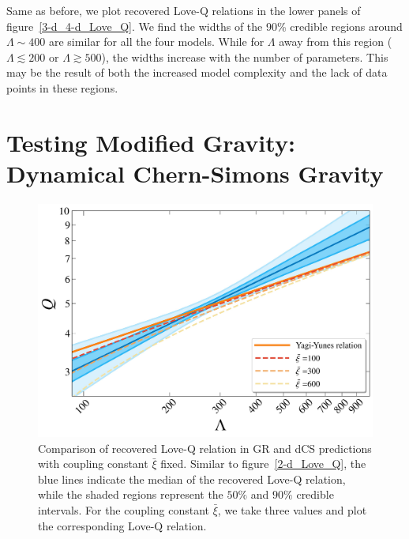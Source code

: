 \documentclass[a4paper,11pt]{article}
\begin{document}
Same as before, we plot recovered Love-Q relations in the lower panels of 
figure~\ref{3-d_4-d_Love_Q}. We find the widths of the 90\% credible regions 
around $\Lambda \sim 400$ are similar for all the four models. While for
$\Lambda$ away from this region ($\Lambda \lesssim 200$ or $\Lambda \gtrsim 500$), 
the widths increase with the number of parameters. This may be the result of both 
the increased model complexity and the lack of data points in these
regions. 

\section{Testing Modified Gravity: Dynamical Chern-Simons Gravity}
\label{sec:dCS}

\begin{figure}[t]
    \centering
    \begin{minipage}{0.6\linewidth}
        \includegraphics[width=\linewidth]{CS_xi_bar_APR4_2d.pdf}
    \end{minipage}
    \caption{Comparison of recovered Love-Q relation in GR
    and dCS predictions 
    with coupling constant $\bar{\xi}$ fixed. Similar to figure~\ref{2-d_Love_Q}, the
    blue lines indicate the median of the recovered Love-Q relation, while the
    shaded regions represent the $50\%$ and $90\%$ credible intervals. For the coupling constant 
    $\bar\xi$, we take three values
    and plot the corresponding Love-Q relation.}
    \label{cs_Love_Q}
\end{figure}
\end{document}
